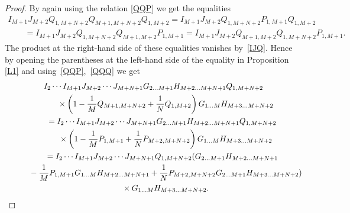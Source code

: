 \documentclass[10pt,a4paper]{amsart}
\numberwithin{equation}{section}
\begin{document}
\begin{proof}
By again using the relation \eqref{QQP} we get the equalities
\begin{gather*}
 I_{M+1} J_{M+2} Q_{1,M+N+2} Q_{M+1,M+N+2} Q_{1,M+2}=
I_{M+1} J_{M+2} Q_{1,M+N+2} P_{1,M+1} Q_{1,M+2}\\
\qquad{} =
I_{M+1} J_{M+2} Q_{1,M+N+2} Q_{M+1,M+2} P_{1,M+1}=
I_{M+1} J_{M+2} Q_{M+1,M+2} Q_{1,M+N+2} P_{1,M+1} .
\end{gather*}
The product at the right-hand side of these equalities
vanishes by~\eqref{IJQ}.
Hence by opening the parentheses at the left-hand side of the equality
in Proposition \ref{L1} and using~\eqref{QQP},~\eqref{QQQ} we get
\begin{gather}
I_{2} \cdots I_{M+1}
J_{M+2} \cdots J_{M+N+1}
G_{2 \dots M+1} H_{M+2 \dots M+N+1}
Q_{1,M+N+2}\nonumber\\
\qquad\quad {}\times
\left( 1-\frac1M Q_{M+1,M+N+2}+\frac1N Q_{1,M+2} \right)
G_{1 \dots M} H_{M+3 \dots M+N+2}\notag\\
\qquad{} =
I_{2} \cdots I_{M+1}
J_{M+2} \cdots J_{M+N+1}
G_{2 \dots M+1} H_{M+2 \dots M+N+1}
Q_{1,M+N+2}\notag\\
\qquad\quad {} \times
\left( 1-\frac1M P_{1,M+1}+\frac1N P_{M+2,M+N+2} \right)
G_{1 \dots M} H_{M+3 \dots M+N+2}\notag\\
\qquad {} =
I_{2} \cdots I_{M+1}
J_{M+2} \cdots J_{M+N+1}
Q_{1,M+N+2}
( G_{2 \dots M+1} H_{M+2 \dots M+N+1}\notag\\
\qquad\quad{}
-\frac1M P_{1,M+1}
G_{1 \dots M} H_{M+2 \dots M+N+1}
+\frac1N P_{M+2,M+N+2}
G_{2 \dots M+1} H_{M+3 \dots M+N+2} )\notag\\
\qquad\quad {} \times
G_{1 \dots M} H_{M+3 \dots M+N+2} .\label{chain}
\end{gather}


\end{proof}
\end{document}
